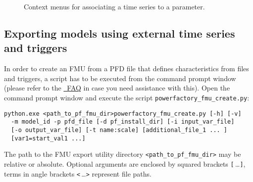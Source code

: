 \begin{figure}[h!]
\vspace*{2em}
\caption{Context menus for associating a time series to a parameter.}
\label{fig:add_characteristics_from_file}
\end{figure}

\clearpage

\subsection{Exporting models using external time series and triggers}

In order to create an FMU from a PFD file that defines characteristics from files and triggers, a \python script has to be executed from the command prompt window (please refer to the \href{https://docs.python.org/2/faq/windows.html}{\python~FAQ} in case you need assistance with this).
Open the command prompt window and execute the script \texttt{powerfactory\_fmu\_create.py}:

\begin{verbatim}
python.exe <path_to_pf_fmu_dir>powerfactory_fmu_create.py [-h] [-v] 
  -m model_id -p pfd_file [-d pf_install_dir] [-i input_var_file]
  [-o output_var_file] [-t name:scale] [additional_file_1 ... ]
  [var1=start_val1 ...]
\end{verbatim}

The path to the \fmipp \pf FMU export utility directory \verb!<path_to_pf_fmu_dir>! may be relative or absolute.
Optional arguments are enclosed by squared brackets \verb![!$\,$\ldots\verb!]!, terms in angle brackets \verb!<!$\,$\ldots\verb!>! represent file paths.
  
